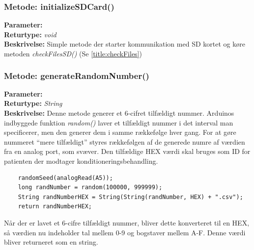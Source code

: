 \subsubsection{Metode: initializeSDCard()}
\textbf{Parameter: } 
\\ \textbf{Returtype: } \textit{void}
\\ \textbf{Beskrivelse: }  Simple metode der starter kommunikation med SD kortet og køre metoden\textit{ checkFilesSD()} (Se \ref{title:checkFiles})

\subsubsection{Metode: generateRandomNumber()} \label{title:RandomNumber}
\textbf{Parameter: } 
\\ \textbf{Returtype: } \textit{String}
\\ \textbf{Beskrivelse: }  Denne metode generer et 6-cifret tilfældigt nummer. Arduinos indbyggede funktion \textit{random()} laver et tilfældigt nummer i det interval man specificerer, men den generer dem i samme rækkefølge hver gang. For at gøre nummeret “mere tilfældigt” styres rækkefølgen af de generede numre af værdien fra en analog port, som svæver. Den tilfældige HEX værdi skal bruges som ID for patienten der modtager konditioneringsbehandling.
\begin{lstlisting}
	randomSeed(analogRead(A5)); 
	long randNumber = random(100000, 999999); 
	String randNumberHEX = String(String(randNumber, HEX) +	".csv");
	return randNumberHEX; 
\end{lstlisting}
Når der er lavet et 6-cifre tilfældigt nummer, bliver dette konverteret til en HEX, så værdien nu indeholder tal mellem 0-9 og bogstaver mellem A-F. Denne værdi bliver returneret som en string. 

